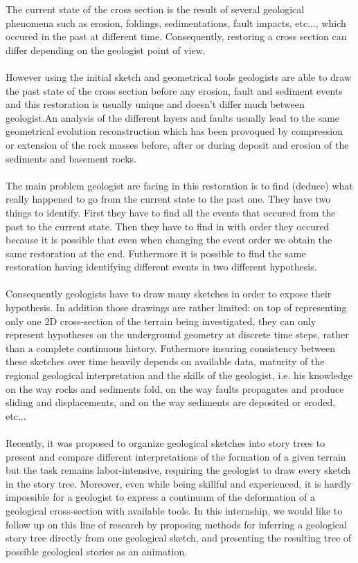 \documentclass[12pt, a4paper]{memoir} %
\begin{document}
The current state of the cross section is the result of several geological phenomena such as erosion, foldings, sedimentations, fault impacts, etc..., which occured in the past at different time. Consequently, restoring a cross section can differ depending on the geologist point of view.\\\\
However using the initial sketch  and geometrical tools \cite{Move} geologists are able to draw the past state of the cross section before any erosion, fault and sediment events and this restoration is usually unique and doesn't differ much between geologist.An analysis of the different layers and faults usually lead to the same geometrical evolution reconstruction which has been provoqued by compression or extension of the rock masses before, after or during deposit and erosion of the sediments and basement rocks. \\\\
The main problem geologist are facing in this restoration is to find (deduce) what really happened to go from the current state to the past one. They have two things to identify. First they have to find all the events that occured from the past to the current state. Then they have to find in with order they occured because it is possible that even when changing the event order we obtain the same restoration at the end. Futhermore it is possible to find the same restoration having identifying different events in two different hypothesis. \\\\
Consequently geologists have to draw many sketches in order to expose their hypothesis. In addition those drawings are rather limited: on top of representing only one 2D cross-section of the terrain being investigated, they can only represent hypotheses on the underground geometry at discrete time steps, rather than a complete continuous history. Futhermore insuring consistency between these sketches over time heavily depends on available data, maturity of the regional geological interpretation and the skills of the geologist, i.e. his knowledge on the way rocks and sediments fold, on the way faults propagates and produce sliding and displacements, and on the way sediments are deposited or eroded, etc...\\\\
Recently, it was proposed to organize geological sketches into story trees to present and compare different interpretations of the formation of a given terrain \cite{lidal} but the task remains labor-intensive, requiring the geologist to draw every sketch in the story tree. Moreover, even while being skillful and experienced, it is hardly impossible for a geologist to express a continuum of the deformation of a geological cross-section with available tools.
In this internship, we would like to follow up on this line of research by proposing methods for inferring a geological story tree directly from one geological sketch, and presenting the resulting tree of possible geological stories as an animation.\\\\
\end{document}
